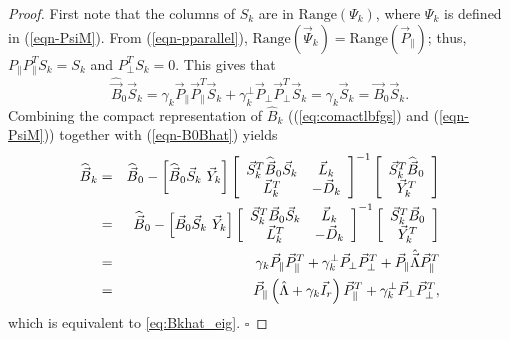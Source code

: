 \begin{proof}
First note that the columns of $S_k$ are in
$\text{Range}(\Psi_k)$, where $\Psi_k$ is defined in (\ref{eqn-PsiM}).  From
(\ref{eqn-pparallel}), $\text{Range} (\vec{\Psi}_k) = \text{Range}
(\vec{P}_{\parallel})$; 
thus,
$P_\parallel P_\parallel^T S_k = S_k$ and $P_\perp^TS_k = 0$.
This gives that
\begin{equation}\label{eqn-B0Bhat}
	\widehat{\vec{B}}_0 \vec{S}_k 
	= \gamma_k \vec{P}_{\parallel}\vec{P}^T_{\parallel} \vec{S}_k 
	+ \gamma^\perp_k \vec{P}_{\perp} \vec{P}^T_{\perp}\vec{S}_k
	= \gamma_k \vec{S}_k 
	= \vec{B}_0 \vec{S}_k.
\end{equation}
Combining the compact representation of $\widehat{B}_k$ ((\ref{eq:comactlbfgs})
and (\ref{eqn-PsiM}))
together with (\ref{eqn-B0Bhat}) yields
\begin{eqnarray*}
	\widehat{\vec{B}}_k 
	&=&  
	\widehat{\vec{B}}_0 - 
	\left[ 
		\widehat{\vec{B}}_0\vec{S}_k \,\, \vec{Y}_k 
	\right] 
	\left[ 
	\begin{array}{c c}
		\vec{S}^T_k	\widehat{\vec{B}}_0 \vec{S}_k 		& \vec{L}_k \\
		\vec{L}^T_k 								& -\vec{D}_k
	\end{array}
	\right]^{-1}
	\left[ 
	\begin{array}{c}
		\vec{S}^T_k	\widehat{\vec{B}}_0	\\
		\vec{Y}^T_k
	\end{array}
	\right ] \\
	&=&  
	\widehat{\vec{B}}_0 - 
	\left[ 
		{\vec{B}}_0\vec{S}_k \,\, \vec{Y}_k 
	\right] 
	\left[ 
	\begin{array}{c c}
		\vec{S}^T_k{\vec{B}}_0 \vec{S}_k 		& \vec{L}_k \\
		\vec{L}^T_k 								& -\vec{D}_k
	\end{array}
	\right]^{-1}
	\left[ 
	\begin{array}{c}
		\vec{S}^T_k{\vec{B}}_0	\\
		\vec{Y}^T_k
	\end{array}
	\right ] \\
	&=&
	 \gamma_k\vec{P}_{\parallel} \vec{P}^T_{\parallel} + \gamma^\perp_k \vec{P}_{\perp} \vec{P}^T_{\perp} 
	 +
	 \vec{P}_{\parallel}  \hat{\vec{\Lambda}} \vec{P}^T_{\parallel}
	 \\
	 &=&
	  \vec{P}_{\parallel} \left( \hat{\Lambda} + \gamma_k \vec{I}_r \right) \vec{P}^T_{\parallel} + \gamma^\perp_k \vec{P}_{\perp}\vec{P}^T_{\perp},
\end{eqnarray*}
which is equivalent to
\eqref{eq:Bkhat_eig}. $\square$
\end{proof}

